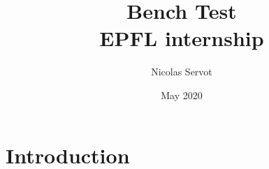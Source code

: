 \documentclass[oneside,a4paper,13pt]{book}
\begin{document}
\title{%
	Bench Test \\ 
	\large EPFL internship}
\author{Nicolas Servot}
\date{May 2020}



\maketitle

\section{Introduction}
\end{document}
